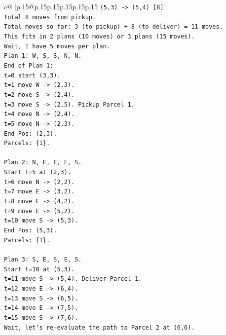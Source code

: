 \documentclass{article}
\begin{document}
{\begin{supertabular}{c@{$\;$}|p{.15\linewidth}@{}p{.15\linewidth}p{.15\linewidth}p{.15\linewidth}p{.15\linewidth}p{.15\linewidth}}
{{{\texttt{(5,3) {-}> (5,4) {[}8{]}} \\
\texttt{Total 8 moves from pickup.} \\
\texttt{Total moves so far: 3 (to pickup) + 8 (to deliver) = 11 moves.} \\
\texttt{This fits in 2 plans (10 moves) or 3 plans (15 moves).} \\
\texttt{Wait, I have 5 moves per plan.} \\
\texttt{Plan 1: W, S, S, N, N.} \\
\texttt{End of Plan 1:} \\
\texttt{t=0 start (3,3).} \\
\texttt{t=1 move W {-}> (2,3).} \\
\texttt{t=2 move S {-}> (2,4).} \\
\texttt{t=3 move S {-}> (2,5). Pickup Parcel 1.} \\
\texttt{t=4 move N {-}> (2,4).} \\
\texttt{t=5 move N {-}> (2,3).} \\
\texttt{End Pos: (2,3).} \\
\texttt{Parcels: \{1\}.} \\
\\ 
\texttt{Plan 2: N, E, E, E, S.} \\
\texttt{Start t=5 at (2,3).} \\
\texttt{t=6 move N {-}> (2,2).} \\
\texttt{t=7 move E {-}> (3,2).} \\
\texttt{t=8 move E {-}> (4,2).} \\
\texttt{t=9 move E {-}> (5,2).} \\
\texttt{t=10 move S {-}> (5,3).} \\
\texttt{End Pos: (5,3).} \\
\texttt{Parcels: \{1\}.} \\
\\ 
\texttt{Plan 3: S, E, S, E, S.} \\
\texttt{Start t=10 at (5,3).} \\
\texttt{t=11 move S {-}> (5,4). Deliver Parcel 1.} \\
\texttt{t=12 move E {-}> (6,4).} \\
\texttt{t=13 move S {-}> (6,5).} \\
\texttt{t=14 move E {-}> (7,5).} \\
\texttt{t=15 move S {-}> (7,6).} \\
\texttt{Wait, let's re{-}evaluate the path to Parcel 2 at (6,6).} \\
}}}
\end{supertabular}}
\end{document}
